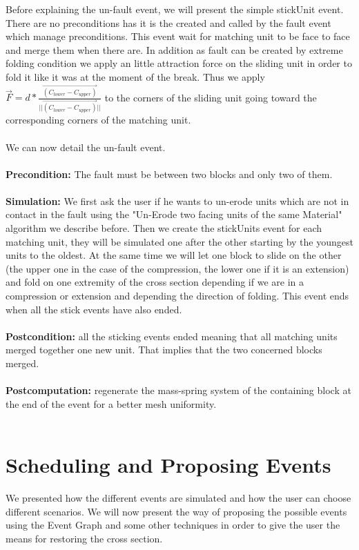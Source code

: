 \documentclass[12pt, a4paper]{memoir} %
\begin{document}
Before explaining the un-fault event, we will present the simple stickUnit event. There are no preconditions has it is the created and called by the fault event which manage preconditions. This event wait for matching unit to be face to face and merge them when there are. In addition as fault can be created by extreme folding condition we apply an little attraction force on the sliding unit in order to fold it like it was at the moment of the break. Thus we apply $\overrightarrow{F} = d*\frac{\overrightarrow{(C_{lower} - C_{upper})} }{||\overrightarrow{(C_{lower} - C_{upper})}||}$ to the corners of the sliding unit going toward the corresponding corners of the matching unit.\\\\
We can now detail the un-fault event.\\\\
\textbf{Precondition:} The fault must be between two blocks and only two of them.\\\\
\textbf{Simulation:} We first ask the user if he wants to un-erode units which are not in contact in the fault using the "Un-Erode two facing units of the same Material" algorithm we describe before. Then we create the stickUnits event for each matching unit, they will be simulated one after the other starting by the youngest units to the oldest. At the same time we will let one block to slide on the other (the upper one in the case of the compression, the lower one if it is an extension) and fold on one extremity of the cross section depending if we are in a compression or extension and depending the direction of folding. This event ends when all the stick events have also ended.\\\\
\textbf{Postcondition:} all the sticking events ended meaning that all matching units merged together one new unit. That implies that the two concerned blocks merged.\\\\
\textbf{Postcomputation:} regenerate the mass-spring system of the containing block at the end of the event for a better mesh uniformity.\\\\ 
	
\chapter{Scheduling and Proposing Events}

We presented how the different events are simulated and how the user can choose different scenarios. We will now present the way of proposing the possible events using the Event Graph and some other techniques in order to give the user the means for restoring the cross section.\\\\
\end{document}
